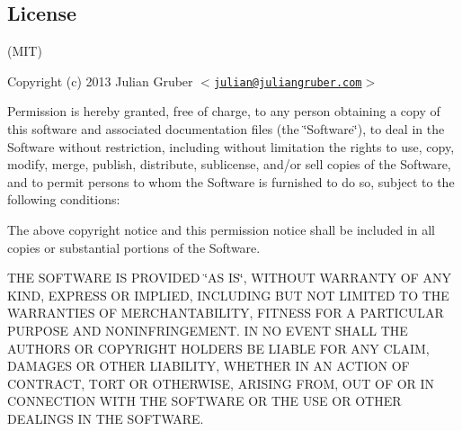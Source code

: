 \subsection*{License}

(M\+IT)

Copyright (c) 2013 Julian Gruber $<$\href{mailto:julian@juliangruber.com}{\tt julian@juliangruber.\+com}$>$

Permission is hereby granted, free of charge, to any person obtaining a copy of this software and associated documentation files (the \char`\"{}\+Software\char`\"{}), to deal in the Software without restriction, including without limitation the rights to use, copy, modify, merge, publish, distribute, sublicense, and/or sell copies of the Software, and to permit persons to whom the Software is furnished to do so, subject to the following conditions\+:

The above copyright notice and this permission notice shall be included in all copies or substantial portions of the Software.

T\+HE S\+O\+F\+T\+W\+A\+RE IS P\+R\+O\+V\+I\+D\+ED \char`\"{}\+A\+S I\+S\char`\"{}, W\+I\+T\+H\+O\+UT W\+A\+R\+R\+A\+N\+TY OF A\+NY K\+I\+ND, E\+X\+P\+R\+E\+SS OR I\+M\+P\+L\+I\+ED, I\+N\+C\+L\+U\+D\+I\+NG B\+UT N\+OT L\+I\+M\+I\+T\+ED TO T\+HE W\+A\+R\+R\+A\+N\+T\+I\+ES OF M\+E\+R\+C\+H\+A\+N\+T\+A\+B\+I\+L\+I\+TY, F\+I\+T\+N\+E\+SS F\+OR A P\+A\+R\+T\+I\+C\+U\+L\+AR P\+U\+R\+P\+O\+SE A\+ND N\+O\+N\+I\+N\+F\+R\+I\+N\+G\+E\+M\+E\+NT. IN NO E\+V\+E\+NT S\+H\+A\+LL T\+HE A\+U\+T\+H\+O\+RS OR C\+O\+P\+Y\+R\+I\+G\+HT H\+O\+L\+D\+E\+RS BE L\+I\+A\+B\+LE F\+OR A\+NY C\+L\+A\+IM, D\+A\+M\+A\+G\+ES OR O\+T\+H\+ER L\+I\+A\+B\+I\+L\+I\+TY, W\+H\+E\+T\+H\+ER IN AN A\+C\+T\+I\+ON OF C\+O\+N\+T\+R\+A\+CT, T\+O\+RT OR O\+T\+H\+E\+R\+W\+I\+SE, A\+R\+I\+S\+I\+NG F\+R\+OM, O\+UT OF OR IN C\+O\+N\+N\+E\+C\+T\+I\+ON W\+I\+TH T\+HE S\+O\+F\+T\+W\+A\+RE OR T\+HE U\+SE OR O\+T\+H\+ER D\+E\+A\+L\+I\+N\+GS IN T\+HE S\+O\+F\+T\+W\+A\+RE. 